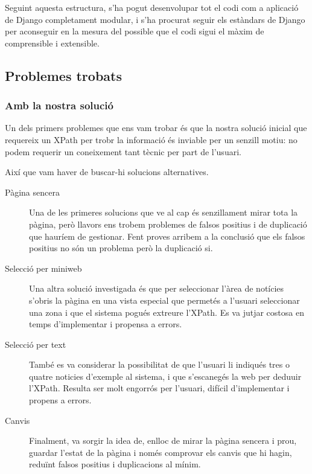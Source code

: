 \documentclass{article}
\begin{document}
Seguint aquesta estructura, s'ha pogut desenvolupar tot el codi com a aplicació de Django completament modular, i s'ha procurat seguir els estàndars de Django per aconseguir en la mesura del possible que el codi sigui el màxim de comprensible i extensible.

\newpage

\subsection{Problemes trobats}

\subsubsection{Amb la nostra solució}

Un dels primers problemes que ens vam trobar és que la nostra solució inicial que requereix un XPath per trobr la informació és inviable per un senzill motiu: no podem requerir un coneixement tant tècnic per part de l'usuari.

Així que vam haver de buscar-hi solucions alternatives.

\begin{description}
    \item[Pàgina sencera] Una de les primeres solucions que ve al cap és senzillament mirar tota la pàgina, però llavors ens trobem problemes de falsos positius i de duplicació que hauríem de gestionar. Fent proves arribem a la conclusió que els falsos positius no són un problema però la duplicació si.
    \item[Selecció per miniweb] Una altra solució investigada és que per seleccionar l'àrea de notícies s'obris la pàgina en una vista especial que permetés a l'usuari seleccionar una zona i que el sistema pogués extreure l'XPath. Es va jutjar costosa en temps d'implementar i propensa a errors.
    \item[Selecció per text] També es va considerar la possibilitat de que l'usuari li indiqués tres o quatre noticies d'exemple al sistema, i que s'escanegés la web per deduuir l'XPath. Resulta ser molt engorrós per l'usuari, difícil d'implementar i propens a errors.
    \item[Canvis] Finalment, va sorgir la idea de, enlloc de mirar la pàgina sencera i prou, guardar l'estat de la pàgina i només comprovar els canvis que hi hagin, reduïnt falsos positius i duplicacions al mínim.
\end{description}

\newpage
\end{document}
